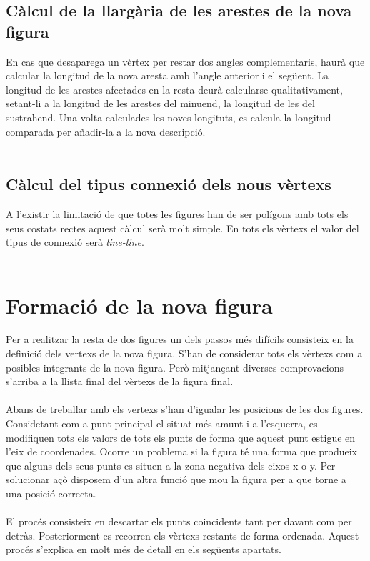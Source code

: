 \documentclass{article}
\begin{document}
\subsection{Càlcul de la llargària de les arestes de la nova figura}
En cas que desaparega un vèrtex per restar dos angles complementaris, haurà que calcular la longitud de la nova aresta amb l’angle anterior i el següent.
La longitud de les arestes afectades en la resta deurà calcularse qualitativament, setant-li a la longitud de les arestes del minuend, la longitud de les del sustrahend.
Una volta calculades les noves longituts, es calcula la longitud comparada per añadir-la a la nova descripció.
\\
\\
\subsection{Càlcul del tipus connexió dels nous vèrtexs}
A l'existir la limitació de que totes les figures han de ser polígons amb tots els seus costats rectes aquest càlcul serà molt simple.
En tots els vèrtexs el valor del tipus de connexió serà \emph{line-line}. 
\\
\\
\section{Formació de la nova figura}
Per a realitzar la resta de dos figures un dels passos més difícils consisteix en la definició dels vertexs de la nova figura.
S'han de considerar tots els vèrtexs com a posibles integrants de la nova figura.
Però mitjançant diverses comprovacions s'arriba a la llista final del vèrtexs de la figura final.
\\
\\
Abans de treballar amb els vertexs s'han d'igualar les posicions de les dos figures.
Considetant com a punt principal el situat més amunt i a l'esquerra, es modifiquen tots els valors de tots els punts de forma que aquest punt estigue en l'eix de coordenades.
Ocorre un problema si la figura té una forma que produeix que alguns dels seus punts es situen a la zona negativa dels eixos x o y.
Per solucionar açò disposem d'un altra funció que mou la figura per a que torne a una posició correcta.
\\
\\
El procés consisteix en descartar els punts coincidents tant per davant com per detràs.
Posteriorment es recorren els vèrtexs restants de forma ordenada.
Aquest procés s'explica en molt més de detall en els següents apartats.
\\
\\
\end{document}
